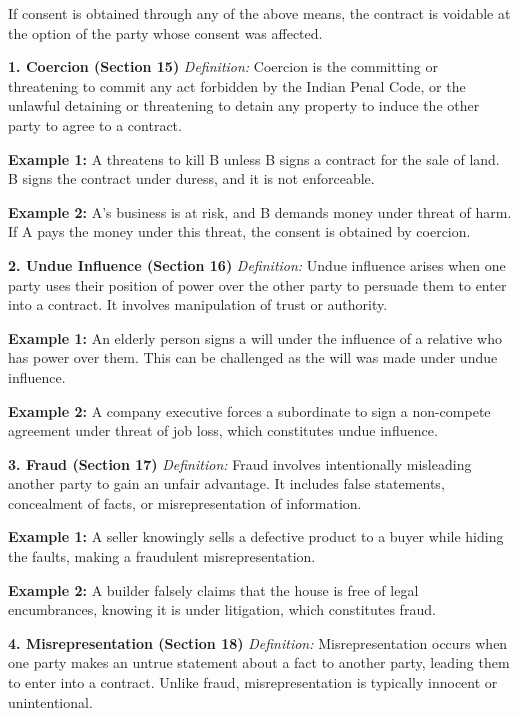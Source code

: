 \documentclass[12pt,a4paper]{book}
\begin{document}
If consent is obtained through any of the above means, the contract is voidable at the option of the party whose consent was affected.

\vspace{0.5cm}
\textbf{1. Coercion (Section 15)}  
\textit{Definition:} Coercion is the committing or threatening to commit any act forbidden by the Indian Penal Code, or the unlawful detaining or threatening to detain any property to induce the other party to agree to a contract.  

\textbf{Example 1:}  
A threatens to kill B unless B signs a contract for the sale of land. B signs the contract under duress, and it is not enforceable.

\textbf{Example 2:}  
A’s business is at risk, and B demands money under threat of harm. If A pays the money under this threat, the consent is obtained by coercion.

\vspace{0.5cm}
\textbf{2. Undue Influence (Section 16)}  
\textit{Definition:} Undue influence arises when one party uses their position of power over the other party to persuade them to enter into a contract. It involves manipulation of trust or authority.  

\textbf{Example 1:}  
An elderly person signs a will under the influence of a relative who has power over them. This can be challenged as the will was made under undue influence.

\textbf{Example 2:}  
A company executive forces a subordinate to sign a non-compete agreement under threat of job loss, which constitutes undue influence.

\vspace{0.5cm}
\textbf{3. Fraud (Section 17)}  
\textit{Definition:} Fraud involves intentionally misleading another party to gain an unfair advantage. It includes false statements, concealment of facts, or misrepresentation of information.  

\textbf{Example 1:}  
A seller knowingly sells a defective product to a buyer while hiding the faults, making a fraudulent misrepresentation.

\textbf{Example 2:}  
A builder falsely claims that the house is free of legal encumbrances, knowing it is under litigation, which constitutes fraud.

\vspace{0.5cm}
\textbf{4. Misrepresentation (Section 18)}  
\textit{Definition:} Misrepresentation occurs when one party makes an untrue statement about a fact to another party, leading them to enter into a contract. Unlike fraud, misrepresentation is typically innocent or unintentional.  
\end{document}
